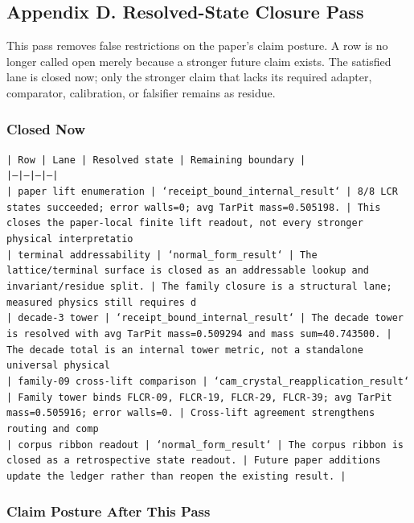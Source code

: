 \documentclass[11pt]{article}
\begin{document}
\subsection*{Appendix D. Resolved-State Closure Pass}

This pass removes false restrictions on the paper's claim posture. A row is no longer called open merely because a stronger future claim exists. The satisfied lane is closed now; only the stronger claim that lacks its required adapter, comparator, calibration, or falsifier remains as residue.

\subsubsection*{Closed Now}

\noindent\texttt{| Row | Lane | Resolved state | Remaining boundary |}\\
\noindent\texttt{|---|---|---|---|}\\
\noindent\texttt{| paper lift enumeration | `receipt\_bound\_internal\_result` | 8/8 LCR states succeeded; error walls=0; avg TarPit mass=0.505198. | This closes the paper-local finite lift readout, not every stronger physical interpretatio}\\
\noindent\texttt{| terminal addressability | `normal\_form\_result` | The lattice/terminal surface is closed as an addressable lookup and invariant/residue split. | The family closure is a structural lane; measured physics still requires d}\\
\noindent\texttt{| decade-3 tower | `receipt\_bound\_internal\_result` | The decade tower is resolved with avg TarPit mass=0.509294 and mass sum=40.743500. | The decade total is an internal tower metric, not a standalone universal physical }\\
\noindent\texttt{| family-09 cross-lift comparison | `cam\_crystal\_reapplication\_result` | Family tower binds FLCR-09, FLCR-19, FLCR-29, FLCR-39; avg TarPit mass=0.505916; error walls=0. | Cross-lift agreement strengthens routing and comp}\\
\noindent\texttt{| corpus ribbon readout | `normal\_form\_result` | The corpus ribbon is closed as a retrospective state readout. | Future paper additions update the ledger rather than reopen the existing result. |}\\

\subsubsection*{Claim Posture After This Pass}
\end{document}
